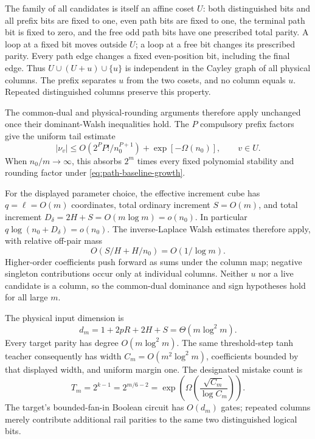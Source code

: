 The family of all candidates is itself an affine coset $U$: both
distinguished bits and all prefix bits are fixed to one, even path
bits are fixed to one, the terminal path bit is fixed to zero, and
the free odd path bits have one prescribed total parity. A loop at
a fixed bit moves outside $U$; a loop at a free bit changes its
prescribed parity. Every path edge changes a fixed even-position
bit, including the final edge. Thus $U\cup(U+u)\cup\{u\}$ is
independent in the Cayley graph of all physical columns. The prefix
separates $u$ from the two cosets, and no column equals $u$.
Repeated distinguished columns preserve this property.

The common-dual and physical-rounding arguments therefore apply
unchanged once their dominant-Walsh inequalities hold. The $P$
compulsory prefix factors give the uniform tail estimate
\[
 |\nu_v|\le O(2^P P!/n_0^{P+1})+\exp[-\Omega(n_0)],
 \qquad v\in U.
\]
When $n_0/m\to\infty$, this absorbs $2^m$ times every fixed
polynomial stability and rounding factor under
\eqref{eq:path-baseline-growth}.

For the displayed parameter choice, the effective increment cube has
$q=\ell=O(m)$ coordinates, total ordinary increment $S=O(m)$, and
total increment $D_\delta=2H+S=O(m\log m)=o(n_0)$. In particular
$q\log(n_0+D_\delta)=o(n_0)$. The inverse-Laplace Walsh estimates
therefore apply, with relative off-pair mass
\[
 O(S/H+H/n_0)=O(1/\log m).
\]
Higher-order coefficients push forward as sums under the column map;
negative singleton contributions occur only at individual columns.
Neither $u$ nor a live candidate is a column, so the common-dual
dominance and sign hypotheses hold for all large $m$.

The physical input dimension is
\[
 d_m=1+2pR+2H+S=\Theta(m\log^2m).
\]
Every target parity has degree $O(m\log^2m)$. The same threshold-step
tanh teacher consequently has width
$C_m=O(m^2\log^2m)$, coefficients bounded by that displayed width,
and uniform margin one. The designated mistake count is
\[
 T_m=2^{k-1}=2^{m/6-2}
 =\exp\!\left(\Omega\!\left(\frac{\sqrt{C_m}}{\log C_m}\right)\right).
\]
The target's bounded-fan-in Boolean circuit has $O(d_m)$ gates;
repeated columns merely contribute additional rail parities to the
same two distinguished logical bits.
